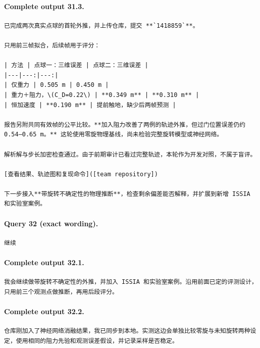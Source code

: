 \documentclass[UTF8,10pt]{ctexart}
\begin{document}
\paragraph{Complete output 31.3.}
\begin{Verbatim}[breaklines=true,breakanywhere=true,fontsize=\scriptsize,frame=single,framesep=2pt]
已完成两次真实点球的首轮外推，并上传仓库，提交 **`1418859`**。

只用前三帧拟合，后续帧用于评分：

| 方法 | 点球一：三维误差 | 点球二：三维误差 |
|---|---:|---:|
| 仅重力 | 0.505 m | 0.450 m |
| 重力＋阻力，\(C_D=0.22\) | **0.349 m** | **0.310 m** |
| 恒加速度 | **0.190 m** | 提前触地，缺少后两帧预测 |

报告另附共同有效帧的公平比较。**加入阻力改善了两例的轨迹外推，但过门位置误差仍约 0.54–0.65 m。** 这轮使用零旋物理基线，尚未检验完整旋转模型或神经网络。

解析解与步长加密检查通过。由于前期审计已看过完整轨迹，本轮作为开发对照，不属于盲评。

[查看结果、轨迹图和复现命令]([team repository])

下一步接入**带旋转不确定性的物理推断**，检查剩余偏差能否解释，并扩展到新增 ISSIA 和实验室案例。
\end{Verbatim}

\paragraph{Query 32 (exact wording).}
\begin{Verbatim}[breaklines=true,breakanywhere=true,fontsize=\scriptsize,frame=single,framesep=2pt]
继续
\end{Verbatim}

\paragraph{Complete output 32.1.}
\begin{Verbatim}[breaklines=true,breakanywhere=true,fontsize=\scriptsize,frame=single,framesep=2pt]
我会继续做带旋转不确定性的外推，并加入 ISSIA 和实验室案例。沿用前面已定的评测设计，只用前三个观测点做推断，再用后段评分。
\end{Verbatim}

\paragraph{Complete output 32.2.}
\begin{Verbatim}[breaklines=true,breakanywhere=true,fontsize=\scriptsize,frame=single,framesep=2pt]
仓库刚加入了神经网络消融结果，我已同步到本地。实测这边会单独比较零旋与未知旋转两种设定，使用相同的阻力先验和观测误差假设，并记录采样是否稳定。
\end{Verbatim}
\end{document}
